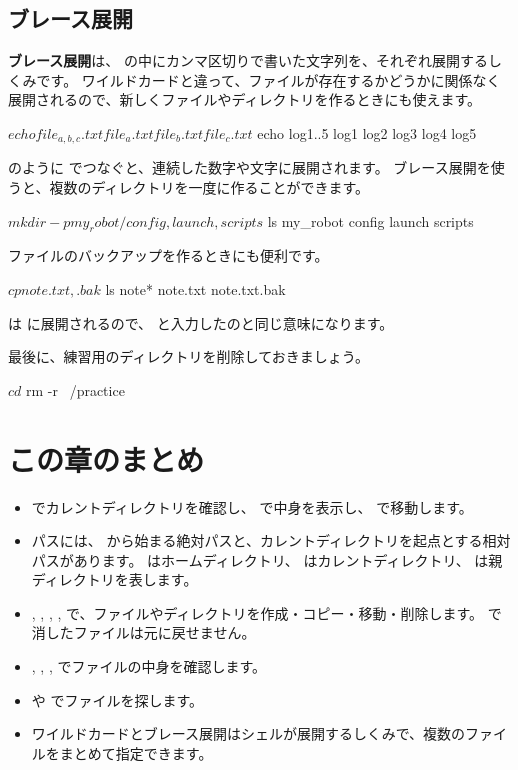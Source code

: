 \subsection{ブレース展開}

\textbf{ブレース展開}は、\cmd{\{ \}} の中にカンマ区切りで書いた文字列を、それぞれ展開するしくみです。
ワイルドカードと違って、ファイルが存在するかどうかに関係なく展開されるので、新しくファイルやディレクトリを作るときにも使えます。

\begin{terminal}[ブレース展開]
$ echo file_{a,b,c}.txt
file_a.txt file_b.txt file_c.txt
$ echo log{1..5}
log1 log2 log3 log4 log5
\end{terminal}

 のように  でつなぐと、連続した数字や文字に展開されます。
ブレース展開を使うと、複数のディレクトリを一度に作ることができます。

\begin{terminal}[複数のディレクトリを一度に作る]
$ mkdir -p my_robot/{config,launch,scripts}
$ ls my_robot
config  launch  scripts
\end{terminal}

ファイルのバックアップを作るときにも便利です。

\begin{terminal}[バックアップを作る]
$ cp note.txt{,.bak}
$ ls note*
note.txt  note.txt.bak
\end{terminal}

 は  に展開されるので、 と入力したのと同じ意味になります。

最後に、練習用のディレクトリを削除しておきましょう。

\begin{terminal}[練習用のディレクトリを削除する]
$ cd
$ rm -r ~/practice
\end{terminal}

\section*{この章のまとめ}

\begin{itemize}
  \item {} でカレントディレクトリを確認し、 で中身を表示し、 で移動します。
  \item パスには、\cmd{/} から始まる絶対パスと、カレントディレクトリを起点とする相対パスがあります。\cmd{\textasciitilde} はホームディレクトリ、 はカレントディレクトリ、 は親ディレクトリを表します。
  \item {}, , , ,  で、ファイルやディレクトリを作成・コピー・移動・削除します。 で消したファイルは元に戻せません。
  \item {}, , ,  でファイルの中身を確認します。
  \item {} や  でファイルを探します。
  \item ワイルドカードとブレース展開はシェルが展開するしくみで、複数のファイルをまとめて指定できます。
\end{itemize}

